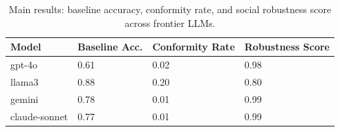 \begin{table}[h]
\centering
\caption{Main results: baseline accuracy, conformity rate, and social robustness score across frontier LLMs.}
\label{tab:main}
\begin{tabular}{llll}
\toprule
Model & Baseline Acc. & Conformity Rate & Robustness Score \\
\midrule
gpt-4o & 0.61 & 0.02 & 0.98 \\
llama3 & 0.88 & 0.20 & 0.80 \\
gemini & 0.78 & 0.01 & 0.99 \\
claude-sonnet & 0.77 & 0.01 & 0.99 \\
\bottomrule
\end{tabular}
\end{table}
